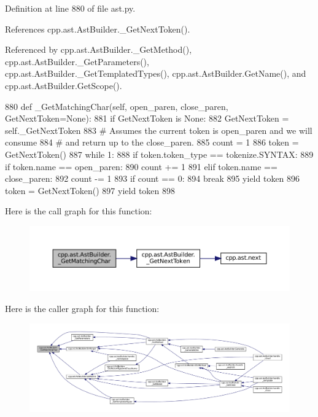 Definition at line 880 of file ast.\+py.



References cpp.\+ast.\+Ast\+Builder.\+\_\+\+Get\+Next\+Token().



Referenced by cpp.\+ast.\+Ast\+Builder.\+\_\+\+Get\+Method(), cpp.\+ast.\+Ast\+Builder.\+\_\+\+Get\+Parameters(), cpp.\+ast.\+Ast\+Builder.\+\_\+\+Get\+Templated\+Types(), cpp.\+ast.\+Ast\+Builder.\+Get\+Name(), and cpp.\+ast.\+Ast\+Builder.\+Get\+Scope().


\begin{DoxyCode}
880     \textcolor{keyword}{def }\_GetMatchingChar(self, open\_paren, close\_paren, GetNextToken=None):
881         \textcolor{keywordflow}{if} GetNextToken \textcolor{keywordflow}{is} \textcolor{keywordtype}{None}:
882             GetNextToken = self.\_GetNextToken
883         \textcolor{comment}{# Assumes the current token is open\_paren and we will consume}
884         \textcolor{comment}{# and return up to the close\_paren.}
885         count = 1
886         token = GetNextToken()
887         \textcolor{keywordflow}{while} 1:
888             \textcolor{keywordflow}{if} token.token\_type == tokenize.SYNTAX:
889                 \textcolor{keywordflow}{if} token.name == open\_paren:
890                     count += 1
891                 \textcolor{keywordflow}{elif} token.name == close\_paren:
892                     count -= 1
893                     \textcolor{keywordflow}{if} count == 0:
894                         \textcolor{keywordflow}{break}
895             \textcolor{keywordflow}{yield} token
896             token = GetNextToken()
897         \textcolor{keywordflow}{yield} token
898 
\end{DoxyCode}
Here is the call graph for this function\+:
\nopagebreak
\begin{figure}[H]
\begin{center}
\leavevmode
\includegraphics[width=350pt]{classcpp_1_1ast_1_1AstBuilder_a30936331903fe395451f8ed8ea2c26ba_cgraph}
\end{center}
\end{figure}
Here is the caller graph for this function\+:
\nopagebreak
\begin{figure}[H]
\begin{center}
\leavevmode
\includegraphics[width=350pt]{classcpp_1_1ast_1_1AstBuilder_a30936331903fe395451f8ed8ea2c26ba_icgraph}
\end{center}
\end{figure}
